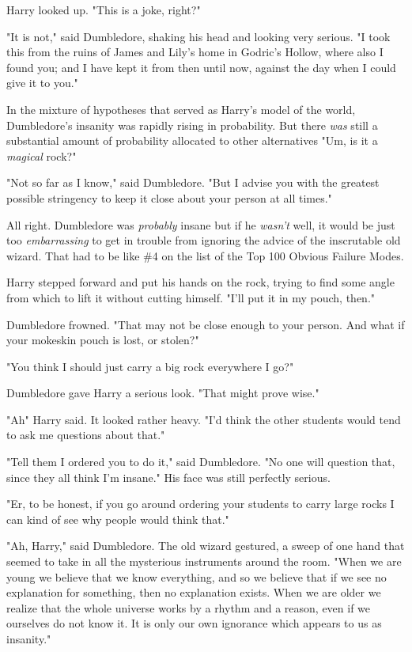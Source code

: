 Harry looked up. "This is a joke, right?"

"It is not," said Dumbledore, shaking his head and looking very serious. "I
took this from the ruins of James and Lily's home in Godric's Hollow, where
also I found you; and I have kept it from then until now, against the day when
I could give it to you."

In the mixture of hypotheses that served as Harry's model of the world,
Dumbledore's insanity was rapidly rising in probability. But there \emph{was}
still a substantial amount of probability allocated to other
alternatives{\el} "Um, is it a \emph{magical} rock?"

"Not so far as I know," said Dumbledore. "But I advise you with the greatest
possible stringency to keep it close about your person at all times."

All right. Dumbledore was \emph{probably} insane but if he
\emph{wasn't}{\el} well, it would be just too \emph{embarrassing} to get in
trouble from ignoring the advice of the inscrutable old wizard. That had to be
like \#4 on the list of the Top 100 Obvious Failure Modes.

Harry stepped forward and put his hands on the rock, trying to find some angle
from which to lift it without cutting himself. "I'll put it in my pouch, then."

Dumbledore frowned. "That may not be close enough to your person. And what if
your mokeskin pouch is lost, or stolen?"

"You think I should just carry a big rock everywhere I go?"

Dumbledore gave Harry a serious look. "That might prove wise."

"Ah{\el}" Harry said. It looked rather heavy. "I'd think the other students
would tend to ask me questions about that."

"Tell them I ordered you to do it," said Dumbledore. "No one will question
that, since they all think I'm insane." His face was still perfectly serious.

"Er, to be honest, if you go around ordering your students to carry large rocks
I can kind of see why people would think that."

"Ah, Harry," said Dumbledore. The old wizard gestured, a sweep of one hand that
seemed to take in all the mysterious instruments around the room. "When we are
young we believe that we know everything, and so we believe that if we see no
explanation for something, then no explanation exists. When we are older we
realize that the whole universe works by a rhythm and a reason, even if we
ourselves do not know it. It is only our own ignorance which appears to us as
insanity."

